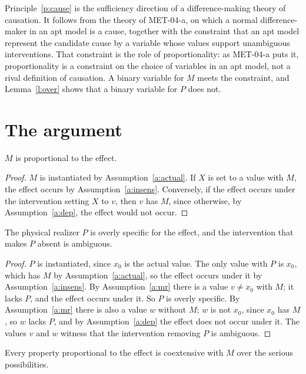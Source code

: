 \documentclass{situationist-preprint}
\begin{document}
Principle~\ref{p:cause} is the sufficiency direction of a difference-making theory of causation. It follows from the theory of MET-04-a, on which a normal difference-maker in an apt model is a cause, together with the constraint that an apt model represent the candidate cause by a variable whose values support unambiguous interventions. That constraint is the role of proportionality: as MET-04-a puts it, proportionality is a constraint on the choice of variables in an apt model, not a rival definition of causation. A binary variable for $M$ meets the constraint, and Lemma~\ref{l:over} shows that a binary variable for $P$ does not.

\section{The argument}\label{s:argument}

\begin{lemma}\label{l:prop}
$M$ is proportional to the effect.
\end{lemma}

\begin{proof}
$M$ is instantiated by Assumption~\ref{a:actual}. If $X$ is set to a value with $M$, the effect occurs by Assumption~\ref{a:insens}. Conversely, if the effect occurs under the intervention setting $X$ to $v$, then $v$ has $M$, since otherwise, by Assumption~\ref{a:dep}, the effect would not occur.
\end{proof}

\begin{lemma}\label{l:over}
The physical realizer $P$ is overly specific for the effect, and the intervention that makes $P$ absent is ambiguous.
\end{lemma}

\begin{proof}
$P$ is instantiated, since $x_0$ is the actual value. The only value with $P$ is $x_0$, which has $M$ by Assumption~\ref{a:actual}, so the effect occurs under it by Assumption~\ref{a:insens}. By Assumption~\ref{a:mr} there is a value $v \neq x_0$ with $M$; it lacks $P$, and the effect occurs under it. So $P$ is overly specific. By Assumption~\ref{a:mr} there is also a value $w$ without $M$; $w$ is not $x_0$, since $x_0$ has $M$, so $w$ lacks $P$, and by Assumption~\ref{a:dep} the effect does not occur under it. The values $v$ and $w$ witness that the intervention removing $P$ is ambiguous.
\end{proof}

\begin{proposition}[Uniqueness]\label{p:unique}
Every property proportional to the effect is coextensive with $M$ over the serious possibilities.
\end{proposition}
\end{document}
